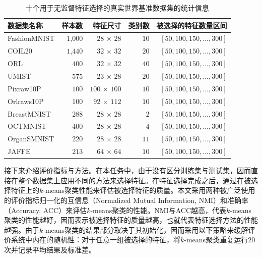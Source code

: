 \begin{table}[!t]
\centering
\caption{十个用于无监督特征选择的真实世界基准数据集的统计信息}
\label{tab:datesets-ufs}
\begin{tabular}{lrrrr}
\toprule
数据集名称 & 样本数 & 特征尺寸 & 类别数 & 被选择的特征数量区间 \\ \midrule
FashionMNIST  & $1$,$000$          & $28$ $\times$ $28$         & $10$            & $[50,100,150,\ldots,300]$            \\
COIL20  & $1$,$440$          & $32$ $\times$ $32$         & $20$            & $[50,100,150,\ldots,300]$            \\
ORL  & $400$          & $32$ $\times$ $32$         & $40$            & $[50,100,150,\ldots,300]$            \\
UMIST  & $575$          & $23$ $\times$ $28$         & $20$            & $[50,100,150,\ldots,300]$            \\
Pixraw10P     & $100$           & $100$ $\times$ $100$         & $10$            & $[50,100,150,\ldots,300]$             \\
Orlraws10P    & $100$           & $92$ $\times$ $112$         & $10$            & $[50,100,150,\ldots,300]$            \\
BreastMNIST  & $288$          & $28$ $\times$ $28$         & $2$            & $[50,100,150,\ldots,300]$            \\
OCTMNIST      & $400$          & $28$ $\times$ $28$         & $4$            & $[50,100,150,\ldots,300]$  \\
OrganSMNIST    & $220$          & $28$ $\times$ $28$         & $11$            & $[50,100,150,\ldots,300]$            \\
JAFFE    & $213$          & $64$ $\times$ $64$         & $10$            & $[50,100,150,\ldots,300]$            \\
\bottomrule
\end{tabular}

\end{table}

接下来介绍评价指标与方法。在本任务中，由于没有区分训练集与测试集，因而直接在整个数据集上应用不同的方法来选择特征。在特征选择完成之后，通过在被选择特征上的$k$-means聚类性能来评估被选择特征的质量。本文采用两种被广泛使用的评价指标归一化的互信息（Normalized Mutual Information, NMI）和准确率（Accuracy, ACC）来评估$k$-means聚类的性能。NMI与ACC越高，代表$k$-means聚类的性能越好，因而表示被选择特征的质量越高，也就代表特征选择方法的性能越强。由于$k$-means聚类的结果部分取决于其初始化，因而采用以下策略来缓解评价系统中内在的随机性：对于任意一组被选择的特征，将$k$-means聚类重复运行$20$次并记录平均结果及标准差。

